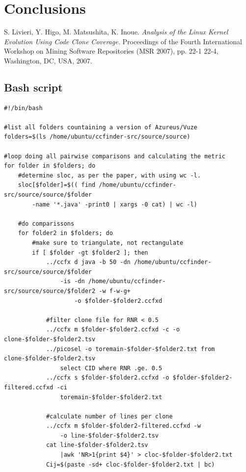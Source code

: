 \documentclass[a4paper,twoside, twocolumn, 11pt]{article}
\numberwithin{equation}{section}
\begin{document}
\section{Conclusions}

\begin{thebibliography}{9}
S. Livieri, Y. Higo, M. Matsushita, K. Inoue. \emph{Analysis of the Linux Kernel Evolution Using Code Clone Coverage.} Proceedings of the Fourth International Workshop on Mining Software Repositories (MSR 2007),  pp. 22-1 22-4, Washington, DC, USA, 2007.
\end{thebibliography}

\onecolumn
\pagestyle{empty} %
\begin{appendices}
\section{Bash script}\label{script}
\scriptsize
\begin{verbatim}
#!/bin/bash

#list all folders countaining a version of Azureus/Vuze
folders=$(ls /home/ubuntu/ccfinder-src/source/source)

#loop doing all pairwise comparisons and calculating the metric
for folder in $folders; do
    #determine sloc, as per the paper, with using wc -l.
    sloc[$folder]=$(( find /home/ubuntu/ccfinder-src/source/source/$folder 
        -name '*.java' -print0 | xargs -0 cat) | wc -l)

    #do comparissons
    for folder2 in $folders; do    
        #make sure to triangulate, not rectangulate
        if [ $folder -gt $folder2 ]; then     
            ../ccfx d java -b 50 -dn /home/ubuntu/ccfinder-src/source/source/$folder 
                -is -dn /home/ubuntu/ccfinder-src/source/source/$folder2 -w f-w-g+ 
                    -o $folder-$folder2.ccfxd 

            #filter clone file for RNR < 0.5
            ../ccfx m $folder-$folder2.ccfxd -c -o clone-$folder-$folder2.tsv            
            ../picosel -o toremain-$folder-$folder2.txt from clone-$folder-$folder2.tsv 
                select CID where RNR .ge. 0.5
            ../ccfx s $folder-$folder2.ccfxd -o $folder-$folder2-filtered.ccfxd -ci 
                toremain-$folder-$folder2.txt

            #calculate number of lines per clone
            ../ccfx m $folder-$folder2-filtered.ccfxd -w 
                -o line-$folder-$folder2.tsv 
            cat line-$folder-$folder2.tsv
                |awk 'NR>1{print $4}' > cloc-$folder-$folder2.txt
            Cij=$(paste -sd+ cloc-$folder-$folder2.txt | bc)


\end{verbatim}
\end{appendices}
\end{document}
